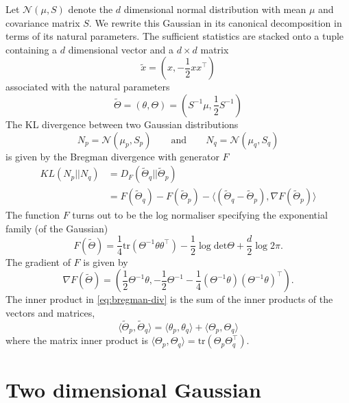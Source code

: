 \documentclass[a4paper]{article}
\newcommand{\normal}{\mathcal{N}}
\newcommand{\thetaall}{\tilde{\Theta}}
\newcommand{\dotprod}[2]{\langle #1 , #2 \rangle}
\newcommand{\trace}{\mathrm{tr}}
\newcommand{\deter}{\mathrm{det}}
\begin{document}
Let $\normal(\mu, S)$ denote the $d$ dimensional normal distribution with mean $\mu$ and covariance
matrix $S$. We rewrite this Gaussian in its canonical decomposition in terms of its natural
parameters. The sufficient statistics are stacked onto a tuple containing a $d$ dimensional vector
and a $d\times d$ matrix
\[
  \tilde{x} = (x, -\frac{1}{2}xx^\top)
\]
associated with the natural parameters
\begin{equation}
  \label{eq:nat-param}
  \thetaall = (\theta, \Theta) = \left(S^{-1}\mu, \frac{1}{2} S^{-1}\right)
\end{equation}
The KL divergence between two Gaussian distributions
\[
N_p = \normal(\mu_p, S_p)\qquad\mbox{and}\qquad N_q = \normal(\mu_q, S_q)
\]
is given by the Bregman divergence with generator $F$
\begin{align}
  KL(N_p||N_q) &= D_F(\thetaall_q || \thetaall_p)\\
  &= F(\thetaall_q) - F(\thetaall_p) - \dotprod{(\thetaall_q - \thetaall_p)}{\nabla F(\thetaall_p)}
  \label{eq:bregman-div}
\end{align}
The function $F$ turns out to be the log normaliser specifying the exponential family
(of the Gaussian)
\begin{equation}
  \label{eq:log-normaliser}
  F(\thetaall) = \frac{1}{4}\trace(\Theta^{-1} \theta\theta^\top)
    -\frac{1}{2} \log \deter \Theta + \frac{d}{2}\log 2\pi.
\end{equation}
The gradient of $F$ is given by
\begin{equation}
  \label{eq:grad-log-normaliser}
  \nabla F(\thetaall) = \left(
  \frac{1}{2} \Theta^{-1}\theta
  ,
  -\frac{1}{2} \Theta^{-1} - \frac{1}{4} (\Theta^{-1}\theta)(\Theta^{-1}\theta)^\top
  \right).
\end{equation}
The inner product in \eqref{eq:bregman-div} is the sum of the inner products of the
vectors and matrices,
\[
  \dotprod{\thetaall_p}{\thetaall_q} = \dotprod{\theta_p}{\theta_q} + \dotprod{\Theta_p}{\Theta_q}
\]
where the matrix inner product is $\dotprod{\Theta_p}{\Theta_q} = \trace(\Theta_p\Theta_q^\top)$.

\section{Two dimensional Gaussian}
\end{document}
